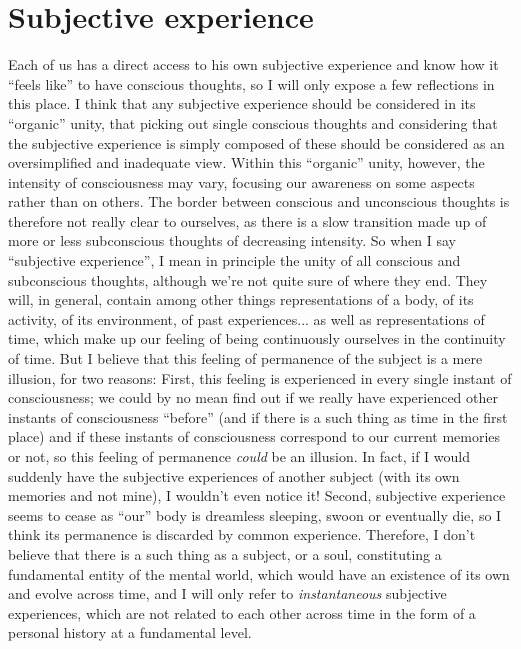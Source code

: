 \section{Subjective experience}

Each of us has a direct access to his own subjective experience and know how it ``feels like'' to have conscious thoughts, so I will only expose a few reflections in this place.
I think that any subjective experience should be considered in its ``organic'' unity, that picking out single conscious thoughts and considering that the subjective experience is simply composed of these should be considered as an oversimplified and inadequate view.
Within this ``organic'' unity, however, the intensity of consciousness may vary, focusing our awareness on some aspects rather than on others.
The border between conscious and unconscious thoughts is therefore not really clear to ourselves, as there is a slow transition made up of more or less subconscious thoughts of decreasing intensity.
So when I say ``subjective experience'', I mean in principle the unity of all conscious and subconscious thoughts, although we're not quite sure of where they end.
They will, in general, contain among other things representations of a body, of its activity, of its environment, of past experiences... as well as representations of time, which make up our feeling of being continuously ourselves in the continuity of time.
But I believe that this feeling of permanence of the subject is a mere illusion, for two reasons: First, this feeling is experienced in every single instant of consciousness; we could by no mean find out if we really have experienced other instants of consciousness ``before'' (and if there is a such thing as time in the first place) and if these instants of consciousness correspond to our current memories or not, so this feeling of permanence \textit{could} be an illusion.
In fact, if I would suddenly have the subjective experiences of another subject (with its own memories and not mine), I wouldn't even notice it! Second, subjective experience seems to cease as ``our'' body is dreamless sleeping, swoon or eventually die, so I think its permanence is discarded by common experience.
Therefore, I don't believe that there is a such thing as a subject, or a soul, constituting a fundamental entity of the mental world, which would have an existence of its own and evolve across time, and I will only refer to \textit{instantaneous} subjective experiences, which are not related to each other across time in the form of a personal history at a fundamental level.

